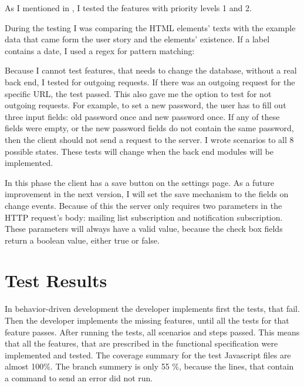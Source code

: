 As I mentioned in , I tested the features with priority levels 1 and 2.

During the testing I was comparing the HTML elements' texts with the example data that came form the user story and the elements' existence. If a label contains a date, I used a regex for pattern matching:


Because I cannot test features, that needs to change the database, without a real back end, I tested for outgoing requests. If there was an outgoing request for the specific URL, the test passed. This  also gave me the option to test for not outgoing requests. For example, to set a new password, the user has to fill out three input fields: old password once and new password once. If any of these fields were empty, or the new password fields do not contain the same password, then the client should not send a request to the server. I wrote scenarios to all 8 possible states. These tests will change when the back end modules will be implemented.

In this phase the client has a save button on the settings page. As a future improvement in the next version, I will set the save mechanism to the fields on change events. Because of this the server only requires two parameters in the HTTP request's body: mailing list subscription and notification subscription. These parameters will always have a valid value, because the check box fields return a boolean value, either true or false.

\section{Test Results}
In behavior-driven development the developer implements first the tests, that fail. Then the developer implements the missing features, until all the tests for that feature passes. After running the tests, all scenarios and steps passed. This means that all the features, that are prescribed in the functional specification were implemented and tested. The coverage summary for the test Javascript files are almost 100\%. The branch summery is only 55 \%, because the lines, that contain a command to send an error did not run.

